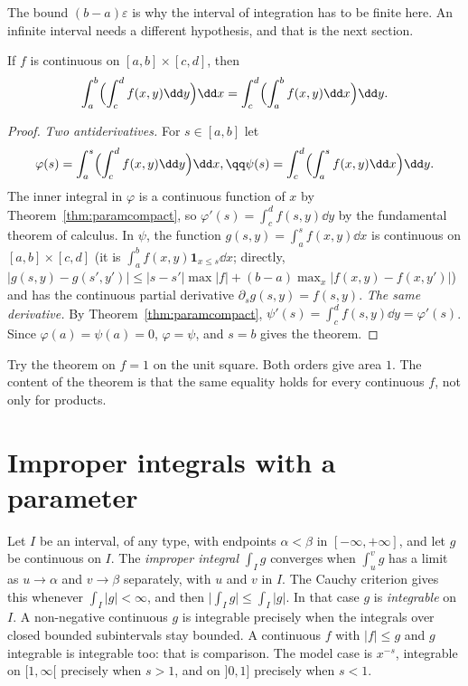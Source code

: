 The bound $(b-a)\varepsilon$ is why the interval of integration has to be finite here. An infinite interval needs a different hypothesis, and that is the next section.

\begin{theorem}\label{thm:fubinirect}
If $f$ is continuous on $[a,b]\times[c,d]$, then
\[
\int_a^b\Bigl(\int_c^df(x,y)\dd y\Bigr)\dd x=\int_c^d\Bigl(\int_a^bf(x,y)\dd x\Bigr)\dd y.
\]
\end{theorem}
\begin{proof}
\emph{Two antiderivatives.}
For $s\in[a,b]$ let
\[
\begin{gathered}\varphi(s)=\int_a^s\Bigl(\int_c^df(x,y)\dd y\Bigr)\dd x,\qq\psi(s)=\int_c^d\Bigl(\int_a^sf(x,y)\dd x\Bigr)\dd y.\end{gathered}
\]
The inner
integral in $\varphi$ is a continuous function of $x$ by Theorem~\ref{thm:paramcompact}, so $\varphi'(s)=\int_c^df(s,y)\dd y$ by the
fundamental theorem of calculus. In $\psi$, the function $g(s,y)=\int_a^sf(x,y)\dd x$ is continuous on $[a,b]\times[c,d]$ (it is
$\int_a^bf(x,y)\mathbf 1_{x\le s}\dd x$; directly, $|g(s,y)-g(s',y')|\le|s-s'|\max|f|+(b-a)\max_x|f(x,y)-f(x,y')|$) and has the
continuous partial derivative $\partial_sg(s,y)=f(s,y)$.
\emph{The same derivative.}
By Theorem~\ref{thm:paramcompact}, $\psi'(s)=\int_c^df(s,y)\dd y=\varphi'(s)$.
Since $\varphi(a)=\psi(a)=0$, $\varphi=\psi$, and $s=b$ gives the theorem.
\end{proof}

Try the theorem on $f=1$ on the unit square. Both orders give area $1$. The content of the theorem is that the same equality holds for every continuous $f$, not only for products.

\section{Improper integrals with a parameter}

Let $I$ be an interval, of any type, with endpoints $\alpha<\beta$ in $[-\infty,+\infty]$, and let $g$ be continuous on $I$. The \emph{improper integral} $\int_Ig$ converges when $\int_u^vg$ has a limit as $u\to\alpha$ and $v\to\beta$ separately, with $u$ and $v$ in $I$. The Cauchy criterion gives this whenever $\int_I|g|<\infty$, and then $\bigl|\int_Ig\bigr|\le\int_I|g|$. In that case $g$ is \emph{integrable} on $I$. A non-negative continuous $g$ is integrable precisely when the integrals over closed bounded subintervals stay bounded. A continuous $f$ with $|f|\le g$ and $g$ integrable is integrable too: that is comparison. The model case is $x^{-s}$, integrable on $[1,\infty[$ precisely when $s>1$, and on $]0,1]$ precisely when $s<1$.

